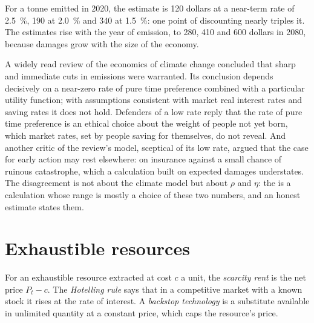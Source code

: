 For a tonne emitted in 2020, the estimate is 120 dollars at a near-term rate of 2.5~\%, 190 at 2.0~\% and 340 at 1.5~\%: one point of discounting
nearly triples it. The estimates rise with the year of emission, to 280, 410 and 600 dollars in 2080, because damages
grow with the size of the economy.

\begin{record}
A widely read review of the economics of climate change concluded that sharp and immediate cuts in emissions
were warranted. Its conclusion depends decisively on a near-zero rate of pure time
preference combined with a particular utility function; with assumptions consistent
with market real interest rates and saving rates it does not hold. %
Defenders of a low rate reply that the rate of pure time preference is an ethical
choice about the weight of people not yet born, which market rates, set by people
saving for themselves, do not reveal. And another critic of the review's model,
sceptical of its low rate, argued that the case for early action may rest elsewhere:
on insurance against a small chance of ruinous catastrophe, which a calculation built
on expected damages understates. %
The disagreement is not about the climate model but about $\rho$ and $\eta$: the  is a calculation whose range is mostly a choice of these two numbers, and an
honest estimate states them.
\end{record}

\section{Exhaustible resources}\label{sec:b3:environmental-and-resource-economics:hotelling}

\begin{definition}\label{def:b3:environmental-and-resource-economics:hotelling}
For an exhaustible resource extracted at cost $c$ a unit, the \emph{scarcity rent} is the
net price $P_t - c$. The \emph{Hotelling rule} says that in a competitive market with a known
stock it rises at the rate of interest. A \emph{backstop technology} is a substitute
available in unlimited quantity at a constant price, which caps the resource's price.
\end{definition}

